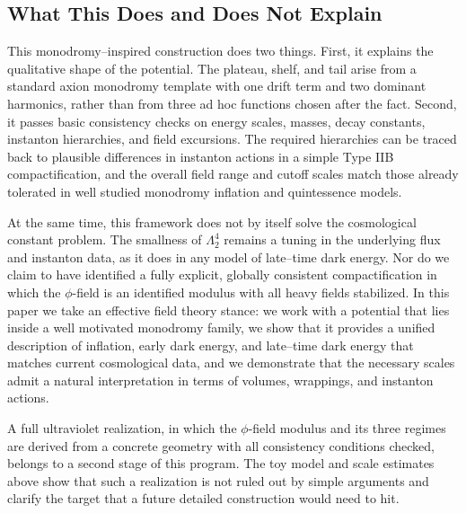 \documentclass[a4paper,11pt]{article}
\begin{document}

\subsection{What This Does and Does Not Explain}
\label{sec:monodromy_limits}

This monodromy–inspired construction does two things. First, it explains the qualitative shape of the potential. The plateau, shelf, and tail arise from a standard axion monodromy template with one drift term and two dominant harmonics, rather than from three ad hoc functions chosen after the fact. Second, it passes basic consistency checks on energy scales, masses, decay constants, instanton hierarchies, and field excursions. The required hierarchies can be traced back to plausible differences in instanton actions in a simple Type IIB compactification, and the overall field range and cutoff scales match those already tolerated in well studied monodromy inflation and quintessence models.

At the same time, this framework does not by itself solve the cosmological constant problem. The smallness of $\Lambda_2^4$ remains a tuning in the underlying flux and instanton data, as it does in any model of late–time dark energy. Nor do we claim to have identified a fully explicit, globally consistent compactification in which the $\phi$-field is an identified modulus with all heavy fields stabilized. In this paper we take an effective field theory stance: we work with a potential that lies inside a well motivated monodromy family, we show that it provides a unified description of inflation, early dark energy, and late–time dark energy that matches current cosmological data, and we demonstrate that the necessary scales admit a natural interpretation in terms of volumes, wrappings, and instanton actions.

A full ultraviolet realization, in which the $\phi$-field modulus and its three regimes are derived from a concrete geometry with all consistency conditions checked, belongs to a second stage of this program. The toy model and scale estimates above show that such a realization is not ruled out by simple arguments and clarify the target that a future detailed construction would need to hit.
\end{document}
